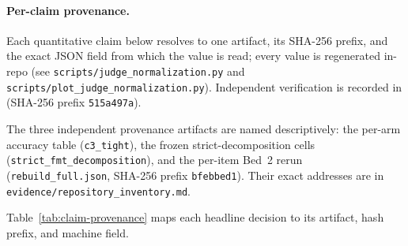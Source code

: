 \documentclass{article}
\begin{document}
\paragraph{Per-claim provenance.}
Each quantitative claim below resolves to one artifact, its SHA-256 prefix, and
the exact JSON field from which the value is read; every value is regenerated
in-repo (see \texttt{scripts/judge\_normalization.py} and
\texttt{scripts/plot\_judge\_normalization.py}).  Independent verification is
recorded in 
(SHA-256 prefix \texttt{515a497a}).

The three independent provenance artifacts are named descriptively: the
per-arm accuracy table (\texttt{c3\_tight}), the frozen strict-decomposition
cells (\texttt{strict\_fmt\_decomposition}), and the per-item Bed~2 rerun
(\texttt{rebuild\_full.json}, SHA-256 prefix \texttt{bfebbed1}).
Their exact addresses are in \texttt{evidence/repository\_inventory.md}.

Table~\ref{tab:claim-provenance} maps each headline decision to its artifact,
hash prefix, and machine field.
\end{document}
